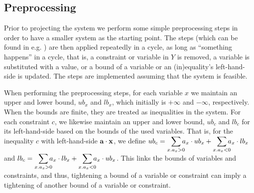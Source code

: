 \subsection{Preprocessing}
Prior to projecting the system we perform some simple preprocessing steps in order to have a smaller system as the starting point. The steps (which can be found in e.g. \cite{brearley75,andersen95,maros})
are then applied repeatedly in a cycle, as long as ``something happens'' in a cycle, that is, a constraint or variable in $Y$ is removed, a variable is substituted with a value, or a bound of a variable or an (in)equality's left-hand-side is updated. The steps are implemented assuming that the system is feasible.

When performing the preprocessing steps, for each variable $x$ we maintain an upper and lower bound, $ub_x$ and $lb_x$, which initially is $+\infty$ and $-\infty$, respectively. When the bounds are finite, they are treated as inequalities in the system. For each constraint $c$, we likewise maintain an upper and lower bound, $ub_c$ and $lb_c$ for its left-hand-side {based on the bounds of the used variables}. That is, for the inequality $c$ with left-hand-side $\mathbf{a}\cdot\mathbf{x}$, we define $ub_c = \smashoperator[r]{\sum_{x. a_x>0}}a_x\cdot ub_x + \smashoperator[r]{\sum_{x.a_x<0}}a_x\cdot lb_x$ and $lb_c = \smashoperator[r]{\sum_{x. a_x>0}}a_x\cdot lb_x + \smashoperator[r]{\sum_{x.a_x<0}}a_x\cdot ub_x$. 
This links the bounds of variables and constraints, and thus, %
tightening a bound of a variable or constraint can imply a tightening of another bound of a variable or constraint. 

